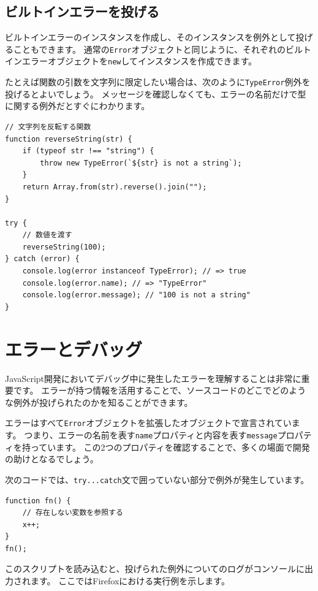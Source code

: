 \hypertarget{throw-built-in-error}{%
\subsection{ビルトインエラーを投げる}\label{throw-built-in-error}}

ビルトインエラーのインスタンスを作成し、そのインスタンスを例外として投げることもできます。
通常の\texttt{Error}オブジェクトと同じように、それぞれのビルトインエラーオブジェクトを\texttt{new}してインスタンスを作成できます。

たとえば関数の引数を文字列に限定したい場合は、次のように\texttt{TypeError}例外を投げるとよいでしょう。
メッセージを確認しなくても、エラーの名前だけで型に関する例外だとすぐにわかります。

\begin{lstlisting}
// 文字列を反転する関数
function reverseString(str) {
    if (typeof str !== "string") {
        throw new TypeError(`${str} is not a string`);
    }
    return Array.from(str).reverse().join("");
}

try {
    // 数値を渡す
    reverseString(100);
} catch (error) {
    console.log(error instanceof TypeError); // => true
    console.log(error.name); // => "TypeError"
    console.log(error.message); // "100 is not a string"
}
\end{lstlisting}

\hypertarget{error-and-debug}{%
\section{エラーとデバッグ}\label{error-and-debug}}

JavaScript開発においてデバッグ中に発生したエラーを理解することは非常に重要です。
エラーが持つ情報を活用することで、ソースコードのどこでどのような例外が投げられたのかを知ることができます。

エラーはすべて\texttt{Error}オブジェクトを拡張したオブジェクトで宣言されています。
つまり、エラーの名前を表す\texttt{name}プロパティと内容を表す\texttt{message}プロパティを持っています。
この2つのプロパティを確認することで、多くの場面で開発の助けとなるでしょう。

次のコードでは、\texttt{try...catch}文で囲っていない部分で例外が発生しています。

\begin{lstlisting}
function fn() {
    // 存在しない変数を参照する
    x++;
}
fn();
\end{lstlisting}

このスクリプトを読み込むと、投げられた例外についてのログがコンソールに出力されます。
ここではFirefoxにおける実行例を示します。

